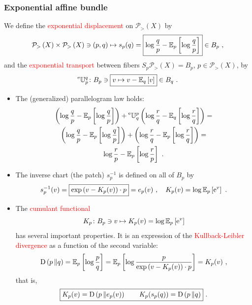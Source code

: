 \documentclass[xcolor=svgnames]{beamer}
\newcommand{\Bspaceat}[1]{B_{#1}}
\newcommand{\eBspace}[1]{B_{#1}}
\newcommand{\rosso}[1]{\textcolor{red}{#1}}
\newcommand{\opensimplexon}[1]{\mathcal P_>\left(#1\right)}
\renewcommand{\emph}{\rosso}
\begin{document}
\begin{frame}\small\frametitle{Exponential affine bundle}

\begin{block}{}We define the \emph{exponential displacement} on $\opensimplexon X$ by
    \begin{equation*}
      \opensimplexon X \times \opensimplexon X \ni (p,q) \mapsto s_p(q) = \boxed{\log \frac q  p - \expectat p {\log \frac q p}} \in \Bspaceat p \ ,
    \end{equation*}
    and the \emph{exponential transport} between fibers $S_p \opensimplexon X = \eBspace p$, $p \in \opensimplexon X$, by
    \begin{equation*}
      \etransport p q \colon \Bspaceat p \ni \boxed{ v \mapsto v - \expectat q v } \in \Bspaceat q \ .
    \end{equation*}
    \end{block}
    
  \begin{itemize}  \item The (generalized) parallelogram law holds:
    \begin{multline*}
      \left(\log \frac q p - \operatorname{\mathbb E}_{p}\left[\log \frac q p\right]\right) + \prescript{\text{e}}{} {\mathbb U} _ {q} ^ {p} \left(\log \frac r q - \operatorname{\mathbb E}_{q}\left[\log \frac r q\right]\right) = \\   \left(\log \frac q p - \operatorname{\mathbb E}_{p}\left[\log \frac q p\right]\right) + \left(\log \frac r q - \operatorname{\mathbb E}_{p}\left[\log \frac r q\right]\right) = \\ \log \frac r p - \operatorname{\mathbb E}_{p}\left[\log \frac r p\right] \ . 
    \end{multline*}
\item The inverse chart (the patch) $s_p^{-1}$ is defined on all of $\Bspaceat p$ by
  \begin{equation*}
    s^{-1}_p(v) = \boxed{\expof{v - K_p(v)} \cdot p} = e_p(v) \ , \quad K_p(v) = \log \expectat p {\euler^v} \ .
  \end{equation*}
\item The \emph{cumulant functional}
\begin{equation*}
   K_p \colon  \eBspace p \ni v \mapsto K_p(v) = \log \expectat p {\euler^v}
\end{equation*}has several important properties. It is an expression of the \emph{Kullback-Leibler divergence} as a function of the second variable:
\begin{equation*}
    \KL p q = \expectat p {\log \frac p q} = \expectat p {\log \frac p {\expof{v - K_p(v)} \cdot p}} = K_p(v) \ ,
\end{equation*}
that is,
    \emph{\begin{equation*}
      \boxed{K_p(v) = \operatorname{D}\left(p\,\Vert e_p(v)\right) \qquad K_p(s_p(q)) = \operatorname{D}\left(p\,\Vert q\right)} \ .
    \end{equation*}}
\end{itemize}


\end{frame}
\end{document}
